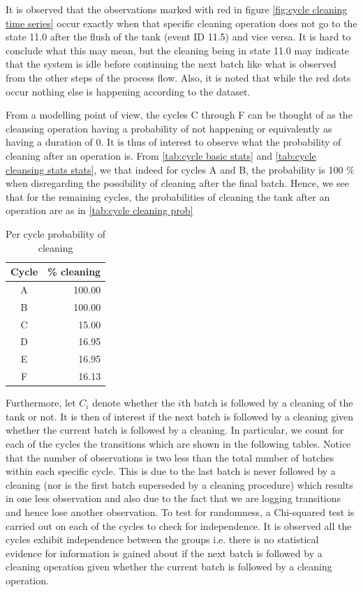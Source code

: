\documentclass[../Thesis.tex]{subfiles}
\begin{document}
It is observed that the observations marked with red in figure \ref{fig:cycle cleaning time series} occur exactly when that specific cleaning operation does not go to the state 11.0 after the flush of the tank (event ID 11.5) and vice versa. It is hard to conclude what this may mean, but the cleaning being in state 11.0 may indicate that the system is idle before continuing the next batch like what is observed from the other steps of the process flow. Also, it is noted that while the red dots occur nothing else is happening according to the dataset.


From a modelling point of view, the cycles C through F can be thought of as the cleansing operation having a probability of not happening or equivalently as having a duration of 0. It is thus of interest to observe what the probability of cleaning after an operation is. From \autoref{tab:cycle basic stats} and \autoref{tab:cycle cleansing stats stats}, we that indeed for cycles A and B, the probability is 100 \% when disregarding the possibility of cleaning after the final batch. Hence, we see that for the remaining cycles, the probabilities of cleaning the tank after an operation are as in \autoref {tab:cycle cleaning prob}

\begin{table}[h]
    \centering
    \begin{tabular}{c|r}
        Cycle & \% cleaning \\ \hline
        A     & 100.00      \\
        B     & 100.00      \\
        C     & 15.00       \\
        D     & 16.95       \\
        E     & 16.95       \\
        F     & 16.13
    \end{tabular}
    \caption{Per cycle probability of cleaning}
    \label{tab:cycle cleaning prob}
\end{table}


Furthermore, let $C_i$ denote whether the $i$th batch is followed by a cleaning of the tank or not. It is then of interest if the next batch is followed by a cleaning given whether the current batch is followed by a cleaning. In particular, we count for each of the cycles the transitions which are shown in the following tables. Notice that the number of observations is two less than the total number of batches within each specific cycle. This is due to the last batch is never followed by a cleaning (nor is the first batch superseded by a cleaning procedure) which results in one less observation and also due to the fact that we are logging transitions and hence lose another observation. To test for randomness, a Chi-squared test is carried out on each of the cycles to check for independence. It is observed all the cycles exhibit independence between the groups i.e. there is no statistical evidence for information is gained about if the next batch is followed by a cleaning operation given whether the current batch is followed by a cleaning operation.
\end{document}

